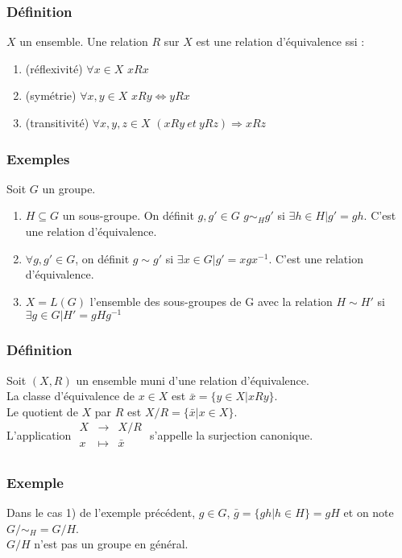 \documentclass[a4paper, oneside]{report}
\theoremstyle{break}
\begin{document}
\subsubsection{Définition}
$X$ un ensemble. Une relation $R$ sur $X$ est une relation d'équivalence ssi :
\begin{enumerate}
\item (réflexivité) $\forall x\in X$ $xRx$
\item (symétrie) $\forall x,y\in X$ $xRy\Leftrightarrow yRx$
\item (transitivité) $\forall x,y,z\in X$ $(xRy~et~yRz)\Rightarrow xRz$
\end{enumerate}

\subsubsection{Exemples}
Soit $G$ un groupe.
\begin{enumerate}
\item $H\subseteq G$ un sous-groupe. On définit $g,g'\in G$ $g\sim_Hg'$ si $\exists h\in H | g'=gh$. C'est une relation d'équivalence.
\item $\forall g,g'\in G$, on définit $g\sim g'$ si $\exists x\in G | g'=xgx^{-1}$. C'est une relation d'équivalence.
\item $X=L(G)$ l'ensemble des sous-groupes de G avec la relation $H\sim H'$ si $\exists g\in G | H'=gHg^{-1}$
\end{enumerate}

\subsubsection{Définition}
Soit $(X,R)$ un ensemble muni d'une relation d'équivalence.\\
La classe d'équivalence de $x\in X$ est $\bar{x}=\{y\in X | xRy \}$.\\
Le quotient de $X$ par $R$ est $X/R=\{\bar{x} | x\in X \}$.\\
L'application $\begin{array}{lll}
X&\rightarrow& X/R\\
x&\mapsto&\bar{x}\\
\end{array}$ s'appelle la surjection canonique.

\subsubsection{Exemple}
Dans le cas 1) de l'exemple précédent, $g\in G$, $\bar{g}=\{gh|h\in H \}=gH$ et on note $G/\sim_H=G/H$.\\
$G/H$ n'est pas un groupe en général.
\end{document}

